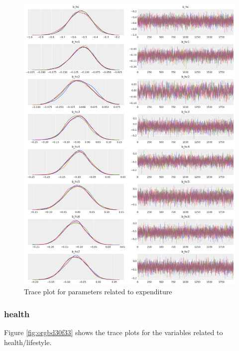 \documentclass[12pt,english,a4paper]{article}
\begin{document}
\begin{figure}[htbp]
\centering
\includegraphics[width=.9\linewidth]{./figures/trace_expenditure.png}
\caption{\label{fig:orgdba2eb8}Trace plot for parameters related to expenditure}
\end{figure}


\subsubsection{health}
\label{sec:orga6cb825}

Figure \ref{fig:orgbd30f33} shows the trace plots for the variables related to health/lifestyle.
\end{document}
